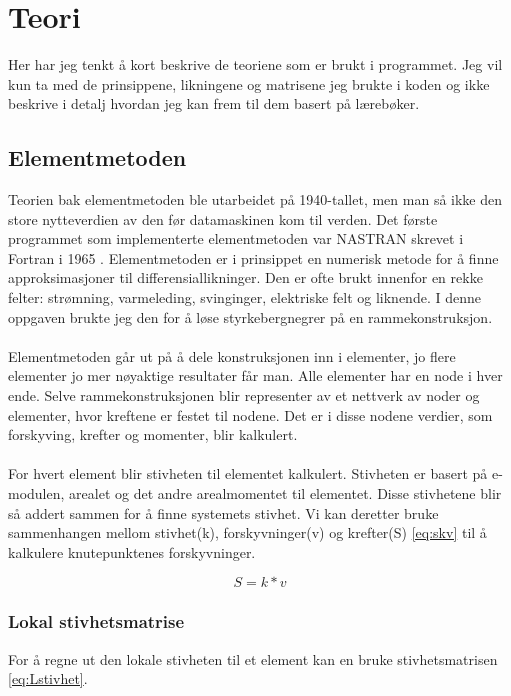 \documentclass[10pt,a4paper, norsk]{article}
\begin{document}
\section{Teori}

Her har jeg tenkt å kort beskrive de teoriene som er brukt i programmet. Jeg vil kun ta med de prinsippene, likningene og matrisene jeg brukte i koden og ikke beskrive i detalj hvordan jeg kan frem til dem basert på lærebøker. 


\subsection{Elementmetoden}
Teorien bak elementmetoden ble utarbeidet på 1940-tallet, men man så ikke den store nytteverdien av den før datamaskinen kom til verden. Det første programmet som implementerte elementmetoden var NASTRAN skrevet i Fortran i 1965 \cite{wikinastran}.
Elementmetoden er i prinsippet en numerisk metode for å finne approksimasjoner til differensiallikninger. Den er ofte brukt innenfor en rekke felter: strømning, varmeleding, svinginger, elektriske felt og liknende. I denne oppgaven brukte jeg den for å løse styrkebergnegrer på en rammekonstruksjon. 

\paragraph*{}
Elementmetoden går ut på å dele konstruksjonen inn i elementer, jo flere elementer jo mer nøyaktige resultater får man. Alle elementer har en node i hver ende. Selve rammekonstruksjonen blir representer av et nettverk av noder og elementer, hvor kreftene er festet til nodene. Det er i disse nodene verdier, som forskyving, krefter og momenter, blir kalkulert.

\paragraph*{}
For hvert element blir stivheten til elementet kalkulert. Stivheten er basert på e-modulen, arealet og det andre arealmomentet til elementet. Disse stivhetene blir så addert sammen for å finne systemets stivhet. Vi kan deretter bruke sammenhangen mellom stivhet(k), forskyvninger(v) og krefter(S) \eqref{eq:skv} til å kalkulere knutepunktenes forskyvninger.

\begin{equation} \label{eq:skv}
S=k*v
\end{equation}

\subsubsection{Lokal stivhetsmatrise}
For å regne ut den lokale stivheten til et element kan en bruke stivhetsmatrisen \eqref{eq:Lstivhet}. 
\end{document}
